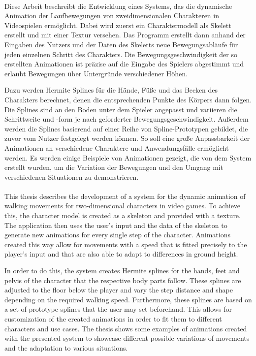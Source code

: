 \kurzfassung

\paragraph*{}
Diese Arbeit beschreibt die Entwicklung eines Systems, das die dynamische Animation der Laufbewegungen von zweidimensionalen Charakteren in Videospielen ermöglicht. Dabei wird zuerst ein Charaktermodell als Skelett erstellt und mit einer Textur versehen. Das Programm erstellt dann anhand der Eingaben des Nutzers und der Daten des Skeletts neue Bewegungsabläufe für jeden einzelnen Schritt des Charakters. Die Bewegungsgeschwindigkeit der so erstellten Animationen ist präzise auf die Eingabe des Spielers abgestimmt und erlaubt Bewegungen über Untergründe verschiedener Höhen.

Dazu werden Hermite Splines für die Hände, Füße und das Becken des Charakters berechnet, denen die entsprechenden Punkte des Körpers dann folgen. Die Splines sind an den Boden unter dem Spieler angepasst und variieren die Schrittweite und -form je nach geforderter Bewegungsgeschwindigkeit.
Außerdem werden die Splines basierend auf einer Reihe von Spline-Prototypen gebildet, die zuvor vom Nutzer festgelegt werden können. So soll eine große Anpassbarkeit der Animationen an verschiedene Charaktere und Anwendungsfälle ermöglicht werden.
Es werden einige Beispiele von Animationen gezeigt, die von dem System erstellt wurden, um die Variation der Bewegungen und den Umgang mit verschiedenen Situationen zu demonstrieren.


\paragraph*{}
This thesis describes the development of a system for the dynamic animation of walking movements for two-dimensional characters in video games. To achieve this, the character model is created as a skeleton and provided with a texture. The application then uses the user's input and the data of the skeleton to generate new animations for every single step of the character. Animations created this way allow for movements with a speed that is fitted precisely to the player's input and that are also able to adapt to differences in ground height.

In order to do this, the system creates Hermite splines for the hands, feet and pelvis of the character that the respective body parts follow. These splines are adjusted to the floor below the player and vary the step distance and shape depending on the required walking speed.
Furthermore, these splines are based on a set of prototype splines that the user may set beforehand. This allows for customization of the created animations in order to fit them to different characters and use cases.
The thesis shows some examples of animations created with the presented system to showcase different possible variations of movements and the adaptation to various situations.